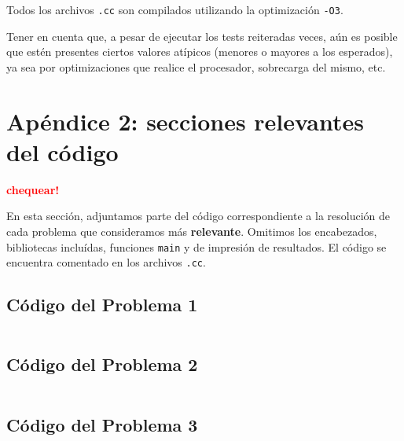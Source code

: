 \documentclass[a4paper]{article}
\begin{document}
Todos los archivos \verb|.cc| son compilados utilizando la optimización \verb|-O3|. \medskip

Tener en cuenta que, a pesar de ejecutar los tests reiteradas veces, aún es posible que estén presentes ciertos
valores atípicos (menores o mayores a los esperados), ya sea por optimizaciones que realice el procesador, sobrecarga
del mismo, etc.
\newpage

\section{Apéndice 2: secciones relevantes del código}

\textcolor{red}{\textbf{chequear!}} \medskip

En esta sección, adjuntamos parte del código correspondiente a la resolución de cada problema
que consideramos más \textbf{relevante}. Omitimos los encabezados, bibliotecas incluídas,
funciones \verb|main| y de impresión de resultados. El código se encuentra comentado en los
archivos \verb|.cc|.

\subsection{Código del Problema 1}


\begin{lstlisting}
\end{lstlisting}

\vspace*{0.5cm}


\newpage


\subsection{Código del Problema 2}


\begin{lstlisting}
\end{lstlisting}

\vspace*{0.5cm}


\newpage


\subsection{Código del Problema 3}


\begin{lstlisting}
\end{lstlisting}

\vspace*{0.5cm}
\end{document}
